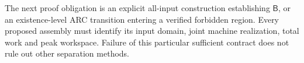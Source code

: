 \documentclass[11pt]{article}
\begin{document}
The next proof obligation is an explicit all-input construction establishing
$\mathsf B$, or an existence-level ARC transition entering a verified
forbidden region. Every proposed assembly must identify its input domain,
joint machine realization, total work and peak workspace. Failure of this
particular sufficient contract does not rule out other separation methods.


\end{document}
